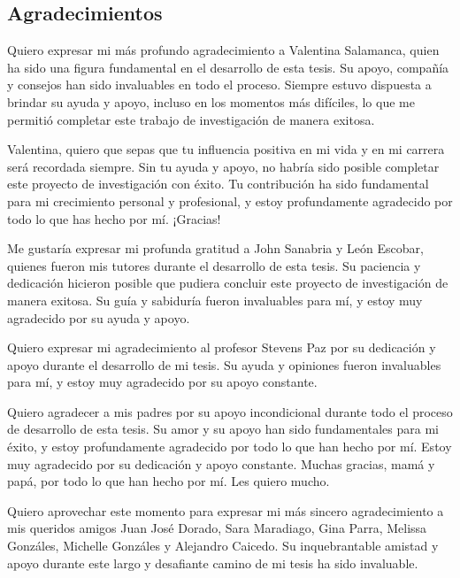 \begin{spacing}{1.5}
  \begin{tightcenter}
    \section{Agradecimientos}
    \mylinespacing
  \end{tightcenter}

  Quiero expresar mi más profundo agradecimiento a Valentina Salamanca, quien ha sido una figura fundamental en el desarrollo de esta tesis. Su apoyo, compañía y consejos han sido invaluables en todo el proceso. Siempre estuvo dispuesta a brindar su ayuda y apoyo, incluso en los momentos más difíciles, lo que me permitió completar este trabajo de investigación de manera exitosa.

  Valentina, quiero que sepas que tu influencia positiva en mi vida y en mi carrera será recordada siempre. Sin tu ayuda y apoyo, no habría sido posible completar este proyecto de investigación con éxito. Tu contribución ha sido fundamental para mi crecimiento personal y profesional, y estoy profundamente agradecido por todo lo que has hecho por mí. ¡Gracias!

  Me gustaría expresar mi profunda gratitud a John Sanabria y León Escobar, quienes fueron mis tutores durante el desarrollo de esta tesis. Su paciencia y dedicación hicieron posible que pudiera concluir este proyecto de investigación de manera exitosa. Su guía y sabiduría fueron invaluables para mí, y estoy muy agradecido por su ayuda y apoyo.

  Quiero expresar mi agradecimiento al profesor Stevens Paz por su dedicación y apoyo durante el desarrollo de mi tesis. Su ayuda y opiniones fueron invaluables para mí, y estoy muy agradecido por su apoyo constante.

  Quiero agradecer a mis padres por su apoyo incondicional durante todo el proceso de desarrollo de esta tesis. Su amor y su apoyo han sido fundamentales para mi éxito, y estoy profundamente agradecido por todo lo que han hecho por mí. Estoy muy agradecido por su dedicación y apoyo constante. Muchas gracias, mamá y papá, por todo lo que han hecho por mí. Les quiero mucho.

  Quiero aprovechar este momento para expresar mi más sincero agradecimiento a mis queridos amigos Juan José Dorado, Sara Maradiago, Gina Parra, Melissa Gonzáles, Michelle Gonzáles y Alejandro Caicedo. Su inquebrantable amistad y apoyo durante este largo y desafiante camino de mi tesis ha sido invaluable.


\end{spacing}
